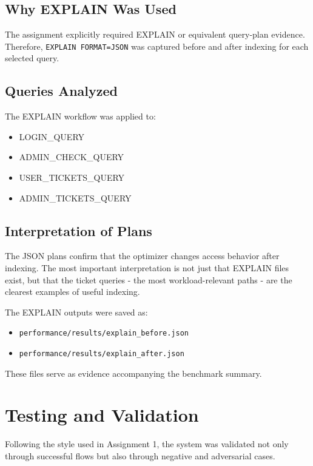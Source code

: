\documentclass[12pt,a4paper]{article}
\begin{document}
\subsection{Why EXPLAIN Was Used}
The assignment explicitly required EXPLAIN or equivalent query-plan evidence. Therefore, \texttt{EXPLAIN FORMAT=JSON} was captured before and after indexing for each selected query.

\subsection{Queries Analyzed}
The EXPLAIN workflow was applied to:
\begin{itemize}[leftmargin=1.5em]
    \item LOGIN\_QUERY
    \item ADMIN\_CHECK\_QUERY
    \item USER\_TICKETS\_QUERY
    \item ADMIN\_TICKETS\_QUERY
\end{itemize}

\subsection{Interpretation of Plans}
The JSON plans confirm that the optimizer changes access behavior after indexing. The most important interpretation is not just that EXPLAIN files exist, but that the ticket queries - the most workload-relevant paths - are the clearest examples of useful indexing.

The EXPLAIN outputs were saved as:
\begin{itemize}[leftmargin=1.5em]
    \item \texttt{performance/results/explain\_before.json}
    \item \texttt{performance/results/explain\_after.json}
\end{itemize}

These files serve as evidence accompanying the benchmark summary.

\section{Testing and Validation}
Following the style used in Assignment 1, the system was validated not only through successful flows but also through negative and adversarial cases.
\end{document}

